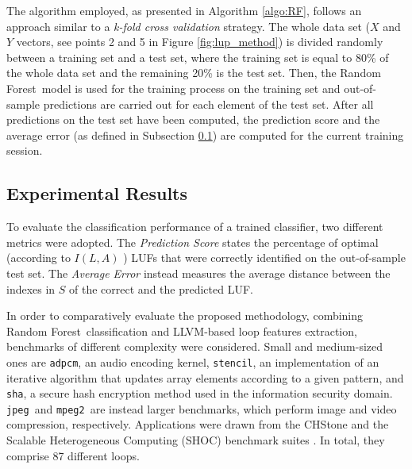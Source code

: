 \documentclass[]{usiinfthesis}
\newcommand{\RF}{{Random Forest}}
\newcommand{\adpcm}{\texttt{adpcm}}
\newcommand{\sha}{\texttt{sha}}
\newcommand{\jpeg}{\texttt{jpeg}}
\newcommand{\mpeg}{\texttt{mpeg2}}
\newcommand{\stencil}{\texttt{stencil}}
\begin{document}
The algorithm employed, as presented in Algorithm \ref{algo:RF},
follows an approach similar to a \textit{k-fold cross validation}
strategy.  The whole data set ($X$ and $Y$ vectors, see points 2 and 5 
in Figure \ref{fig:lup_method}) is divided randomly
between a training set and a test set, where the training set is equal
to 80\% of the whole data set and the remaining 20\% is the test set.
Then, the \RF\ model is used for the training process on the training
set and out-of-sample predictions are carried out for each element of
the test set. After all predictions on the test set have been
computed, the prediction score and the average error (as defined in
Subsection \ref{sec:ml_exp}) are computed for the current training
session.\par

\subsection{Experimental Results}
\label{sec:ml_exp}

To evaluate the classification performance of a trained classifier, two different metrics were
adopted. The \emph{Prediction Score} states the
percentage of optimal (according to $I(L,A)$ ) LUFs that were correctly
identified on the out-of-sample test set. The \emph{Average Error}
instead measures the average distance between the indexes in $S$ of the
correct and the predicted LUF.\par

In order to comparatively evaluate the proposed methodology, combining \RF\ classification and
LLVM-based loop features extraction, benchmarks of different complexity were considered. Small 
and medium-sized ones are \adpcm, an audio encoding kernel, \stencil, an 
implementation of an iterative algorithm that updates array elements according to a given pattern, 
and \sha, a secure hash encryption method
used in the information security domain. \jpeg\ and \mpeg\ are instead larger benchmarks, which 
perform image and video compression, respectively.
Applications were drawn from the CHStone  \cite{HaraMay08} and the Scalable Heterogeneous 
Computing (SHOC) benchmark suites \cite{DanalisMar10}. In total, they comprise 87 different loops.\par

\end{document}
